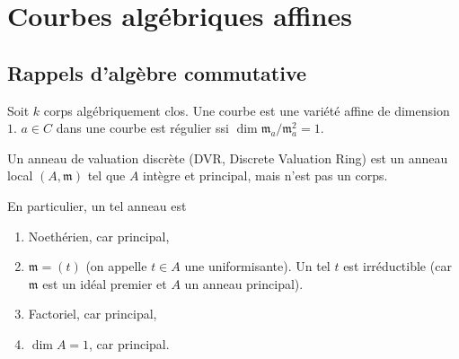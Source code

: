 \chapter{Courbes algébriques affines}
    \section{Rappels d'algèbre commutative}
        Soit $k$ corps algébriquement clos. Une courbe est une variété affine de dimension $1$. $a \in C$ dans une courbe est régulier ssi $\dim \mathfrak{m}_a/\mathfrak{m}_a^2 = 1$.
        \begin{defi}
            Un anneau de valuation discrète (DVR, Discrete Valuation Ring) est un anneau local $(A, \mathfrak{m})$ tel que $A$ intègre et principal, mais n'est pas un corps.
        \end{defi}
        En particulier, un tel anneau est
        \begin{enumerate}
            \item Noethérien, car principal,
            \item $\mathfrak{m} = (t)$ (on appelle $t \in A$ une uniformisante). Un tel $t$ est irréductible (car $\mathfrak{m}$ est un idéal premier et $A$ un anneau principal).
            \item Factoriel, car principal,
            \item $\dim A = 1$, car principal.\\
        \end{enumerate}
